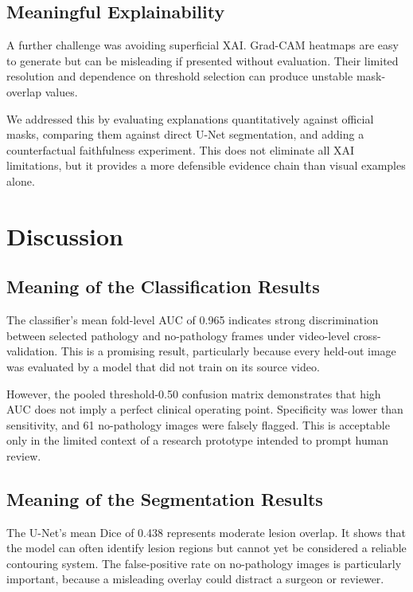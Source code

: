 \subsection{Meaningful Explainability}

A further challenge was avoiding superficial XAI. Grad-CAM heatmaps are easy to generate but can be misleading if presented without evaluation. Their limited resolution and dependence on threshold selection can produce unstable mask-overlap values.

We addressed this by evaluating explanations quantitatively against official masks, comparing them against direct U-Net segmentation, and adding a counterfactual faithfulness experiment. This does not eliminate all XAI limitations, but it provides a more defensible evidence chain than visual examples alone.

\section{Discussion}

\subsection{Meaning of the Classification Results}

The classifier's mean fold-level AUC of 0.965 indicates strong discrimination between selected pathology and no-pathology frames under video-level cross-validation. This is a promising result, particularly because every held-out image was evaluated by a model that did not train on its source video.

However, the pooled threshold-0.50 confusion matrix demonstrates that high AUC does not imply a perfect clinical operating point. Specificity was lower than sensitivity, and 61 no-pathology images were falsely flagged. This is acceptable only in the limited context of a research prototype intended to prompt human review.

\subsection{Meaning of the Segmentation Results}

The U-Net's mean Dice of 0.438 represents moderate lesion overlap. It shows that the model can often identify lesion regions but cannot yet be considered a reliable contouring system. The false-positive rate on no-pathology images is particularly important, because a misleading overlay could distract a surgeon or reviewer.

